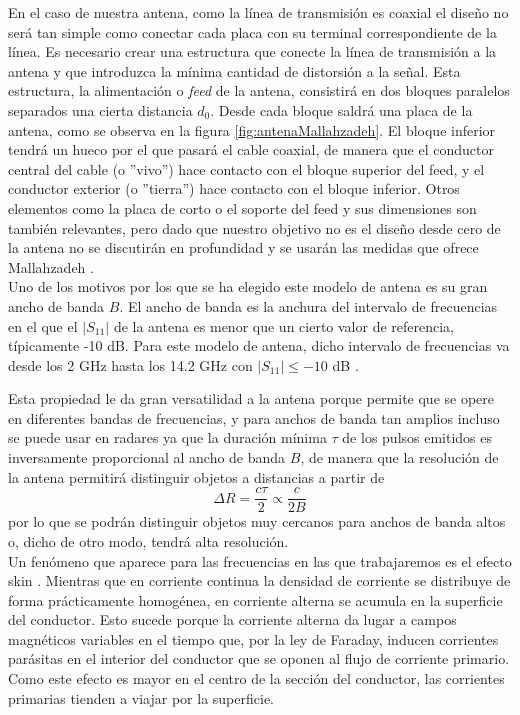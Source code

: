 \documentclass[11pt,a4paper,twoside,pdf]{article}
\numberwithin{equation}{section}
\begin{document}
En el caso de nuestra antena, como la línea de transmisión es coaxial el diseño no será tan simple como conectar cada placa con su terminal correspondiente de la línea. Es necesario crear una estructura que conecte la línea de transmisión a la antena y que introduzca la mínima cantidad de distorsión a la señal. Esta estructura, la alimentación o \textit{feed} de la antena, consistirá en dos bloques paralelos separados una cierta distancia $d_0$. Desde cada bloque saldrá una placa de la antena, como se observa en la figura \ref{fig:antenaMallahzadeh}. El bloque inferior tendrá un hueco por el que pasará el cable coaxial, de manera que el conductor central del cable (o ''vivo'') hace contacto con el bloque superior del feed, y el conductor exterior (o ''tierra'') hace contacto con el bloque inferior. Otros elementos como la placa de corto o el soporte del feed y sus dimensiones son también relevantes, pero dado que nuestro objetivo no es el diseño desde cero de la antena no se discutirán en profundidad y se usarán las medidas que ofrece Mallahzadeh \cite{tem_horn}.\\

Uno de los motivos por los que se ha elegido este modelo de antena es su gran ancho de banda $B$. El ancho de banda es la anchura del intervalo de frecuencias en el que el $|S_{11}|$ de la antena es menor que un cierto valor de referencia, típicamente -10 dB. Para este modelo de antena, dicho intervalo de frecuencias va desde los 2 GHz hasta los 14.2 GHz con $|S_{11}|\leq-10$ dB \cite{tem_horn}. 

Esta propiedad le da gran versatilidad a la antena porque permite que se opere en diferentes bandas de frecuencias, y para anchos de banda tan amplios incluso se puede usar en radares ya que la duración mínima $\tau$ de los pulsos emitidos es inversamente proporcional al ancho de banda $B$, de manera que la resolución de la antena permitirá distinguir objetos a distancias a partir de 
\begin{equation}
    \Delta R = \frac{c\tau}{2}\propto\frac{c}{2B}
\end{equation}
por lo que se podrán distinguir objetos muy cercanos para anchos de banda altos \cite{radar} o, dicho de otro modo, tendrá alta resolución.\\

Un fenómeno que aparece para las frecuencias en las que trabajaremos es el efecto skin \cite{pozar}. Mientras que en corriente continua la densidad de corriente se distribuye de forma prácticamente homogénea, en corriente alterna se acumula en la superficie del conductor. Esto sucede porque la corriente alterna da lugar a campos magnéticos variables en el tiempo que, por la ley de Faraday, inducen corrientes parásitas en el interior del conductor que se oponen al flujo de corriente primario. Como este efecto es mayor en el centro de la sección del conductor, las corrientes primarias tienden a viajar por la superficie.
\end{document}
